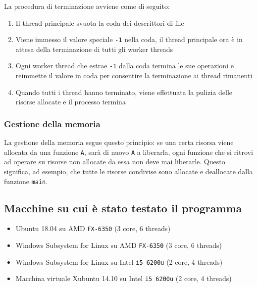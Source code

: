 \documentclass[11pt]{article} %
\begin{document}
La procedura di terminazione avviene come di seguito:
\begin{enumerate}
\item Il thread principale svuota la coda dei descrittori di file
\item Viene immesso il valore speciale \texttt{-1} nella coda, il thread principale ora è in attesa della terminazione di tutti gli worker threads
\item Ogni worker thread che estrae \texttt{-1} dalla coda termina le sue operazioni e reimmette il valore in coda per consentire la terminazione ai thread rimanenti
\item Quando tutti i thread hanno terminato, viene effettuata la pulizia delle risorse allocate e il processo termina
\end{enumerate}

\subsubsection{Gestione della memoria}
La gestione della memoria segue questo principio: se una certa risorsa viene allocata da una funzione \texttt{A}, sarà di nuovo \texttt{A} a liberarla, ogni funzione che si ritrovi ad operare su risorse non allocate da essa non deve mai liberarle. Questo significa, ad esempio, che tutte le risorse condivise sono allocate e deallocate dalla funzione \texttt{main}.

\begin{appendices}
\section{Macchine su cui è stato testato il programma}
\begin{itemize}
\item Ubuntu 18.04 su AMD \texttt{FX-6350} (3 core, 6 threads)
\item Windows Subsystem for Linux su AMD \texttt{FX-6350} (3 core, 6 threads)
\item Windows Subsystem for Linux su Intel \texttt{i5 6200u} (2 core, 4 threads)
\item Macchina virtuale Xubuntu 14.10 su Intel \texttt{i5 6200u} (2 core, 4 threads)
\end{itemize}
\end{appendices}
\end{document}
